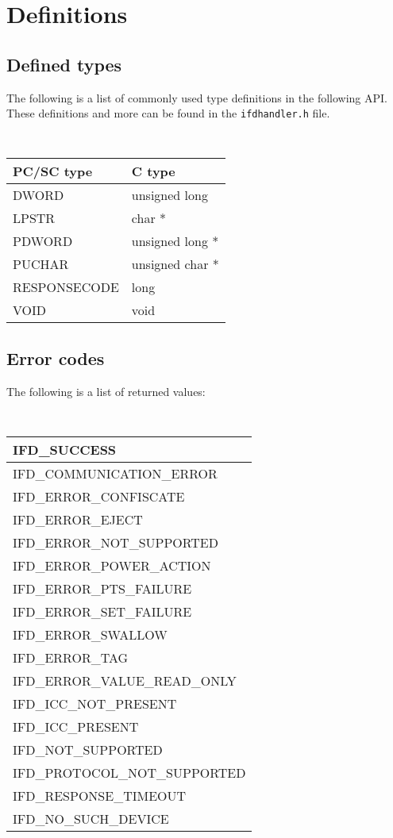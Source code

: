 \documentclass[a4paper,12pt]{article}
\begin{document}
\section{Definitions}


\subsection{Defined types}

The following is a list of commonly used type definitions in the
following API. These definitions and more can be found in the
\texttt{ifdhandler.h} file.

{\tt
\begin{longtable}{|l|l|}
\hline
\textrm{PC/SC type} & \textrm{C type} \\
\hline
\hline
DWORD & unsigned long \\
LPSTR & char * \\
PDWORD & unsigned long * \\
PUCHAR & unsigned char * \\
RESPONSECODE & long \\
VOID & void \\
\hline
\end{longtable}
}


\subsection{Error codes}

The following is a list of returned values:

{\tt
\begin{longtable}{|l|}
\hline
IFD\_SUCCESS \\
\hline
IFD\_COMMUNICATION\_ERROR\\
IFD\_ERROR\_CONFISCATE\\
IFD\_ERROR\_EJECT\\
IFD\_ERROR\_NOT\_SUPPORTED\\
IFD\_ERROR\_POWER\_ACTION\\
IFD\_ERROR\_PTS\_FAILURE\\
IFD\_ERROR\_SET\_FAILURE\\
IFD\_ERROR\_SWALLOW\\
IFD\_ERROR\_TAG\\
IFD\_ERROR\_VALUE\_READ\_ONLY\\
IFD\_ICC\_NOT\_PRESENT\\
IFD\_ICC\_PRESENT\\
IFD\_NOT\_SUPPORTED\\
IFD\_PROTOCOL\_NOT\_SUPPORTED\\
IFD\_RESPONSE\_TIMEOUT\\
IFD\_NO\_SUCH\_DEVICE\\
\hline
\end{longtable}
}
\end{document}
